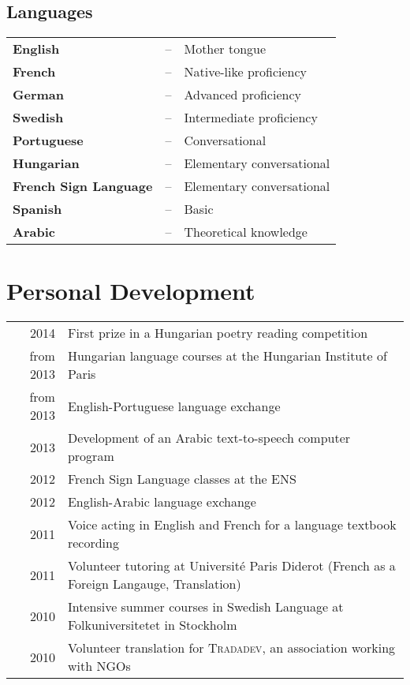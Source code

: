 \documentclass[a4paper, 10pt]{article}
\begin{document}
\subsection*{Languages}
\begin{tabular}{lcl}
\textbf{English} & -- & Mother tongue\\
\textbf{French} & -- & Native-like proficiency\\
\textbf{German} & -- & Advanced proficiency\\
\textbf{Swedish} & -- & Intermediate proficiency\\
\textbf{Portuguese} & -- & Conversational\\
\textbf{Hungarian} & -- & Elementary conversational\\
\textbf{French Sign Language} & -- & Elementary conversational\\
\textbf{Spanish} & -- & Basic\\
\textbf{Arabic} & -- & Theoretical knowledge
\end{tabular}




\section*{Personal Development}
{
\renewcommand{\arraystretch}{1.3}
\begin{tabular}{r|l}
2014 & First prize in a Hungarian poetry reading competition\\
from 2013 & Hungarian language courses at the Hungarian Institute of Paris\\
from 2013 & English-Portuguese language exchange\\
2013 & Development of an Arabic text-to-speech computer program\\
2012 & French Sign Language classes at the ENS\\
2012 & English-Arabic language exchange\\
2011 & Voice acting in English and French for a language textbook recording\\
2011 & Volunteer tutoring at Université Paris Diderot (French as a Foreign Langauge, Translation)\\
2010 & Intensive summer courses in Swedish Language at Folkuniversitetet in Stockholm\\
2010 & Volunteer translation for \textsc{Tradadev}, an association working with NGOs\\
\end{tabular}
}
\fi
\end{document}
